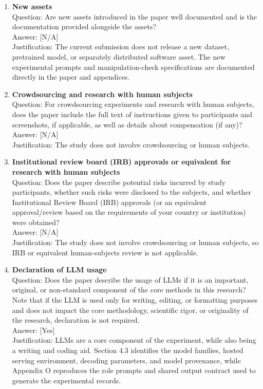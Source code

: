 \begin{enumerate}[leftmargin=*]
\item \textbf{New assets}\\
Question: Are new assets introduced in the paper well documented and is the documentation provided
alongside the assets?\\
Answer: [N/A]\\
Justification: The current submission does not release a new dataset, pretrained model, or separately
distributed software asset. The new experimental prompts and manipulation-check specifications are
documented directly in the paper and appendices.

\item \textbf{Crowdsourcing and research with human subjects}\\
Question: For crowdsourcing experiments and research with human subjects, does the paper include the
full text of instructions given to participants and screenshots, if applicable, as well as details
about compensation (if any)?\\
Answer: [N/A]\\
Justification: The study does not involve crowdsourcing or human subjects.

\item \textbf{Institutional review board (IRB) approvals or equivalent for research with human
subjects}\\
Question: Does the paper describe potential risks incurred by study participants, whether such risks
were disclosed to the subjects, and whether Institutional Review Board (IRB) approvals (or an
equivalent approval/review based on the requirements of your country or institution) were obtained?\\
Answer: [N/A]\\
Justification: The study does not involve crowdsourcing or human subjects, so IRB or equivalent
human-subjects review is not applicable.

\item \textbf{Declaration of LLM usage}\\
Question: Does the paper describe the usage of LLMs if it is an important, original, or non-standard
component of the core methods in this research? Note that if the LLM is used only for writing,
editing, or formatting purposes and does not impact the core methodology, scientific rigor, or
originality of the research, declaration is not required.\\
Answer: [Yes]\\
Justification: LLMs are a core component of the experiment, while also being a writing and coding
aid. Section 4.3 identifies the model families, hosted serving environment, decoding parameters, and
model provenance, while Appendix O reproduces the role prompts and shared output contract used to
generate the experimental records.

\end{enumerate}
